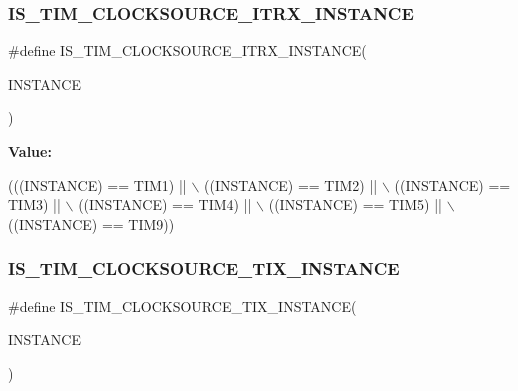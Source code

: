 \subsubsection{\texorpdfstring{I\+S\+\_\+\+T\+I\+M\+\_\+\+C\+L\+O\+C\+K\+S\+O\+U\+R\+C\+E\+\_\+\+I\+T\+R\+X\+\_\+\+I\+N\+S\+T\+A\+N\+CE}{IS\_TIM\_CLOCKSOURCE\_ITRX\_INSTANCE}}
{\footnotesize\ttfamily \#define I\+S\+\_\+\+T\+I\+M\+\_\+\+C\+L\+O\+C\+K\+S\+O\+U\+R\+C\+E\+\_\+\+I\+T\+R\+X\+\_\+\+I\+N\+S\+T\+A\+N\+CE(\begin{DoxyParamCaption}\item[{}]{I\+N\+S\+T\+A\+N\+CE }\end{DoxyParamCaption})}

{\bfseries Value\+:}
\begin{DoxyCode}
(((INSTANCE) == TIM1) || \(\backslash\)
                                                        ((INSTANCE) == TIM2) || \(\backslash\)
                                                        ((INSTANCE) == TIM3) || \(\backslash\)
                                                        ((INSTANCE) == TIM4) || \(\backslash\)
                                                        ((INSTANCE) == TIM5) || \(\backslash\)
                                                        ((INSTANCE) == TIM9))
\end{DoxyCode}
\mbox{\label{group___exported__macros_gacbd23fd1f9f73dc249b16c89131a671c}} 
\subsubsection{\texorpdfstring{I\+S\+\_\+\+T\+I\+M\+\_\+\+C\+L\+O\+C\+K\+S\+O\+U\+R\+C\+E\+\_\+\+T\+I\+X\+\_\+\+I\+N\+S\+T\+A\+N\+CE}{IS\_TIM\_CLOCKSOURCE\_TIX\_INSTANCE}}
{\footnotesize\ttfamily \#define I\+S\+\_\+\+T\+I\+M\+\_\+\+C\+L\+O\+C\+K\+S\+O\+U\+R\+C\+E\+\_\+\+T\+I\+X\+\_\+\+I\+N\+S\+T\+A\+N\+CE(\begin{DoxyParamCaption}\item[{}]{I\+N\+S\+T\+A\+N\+CE }\end{DoxyParamCaption})}

